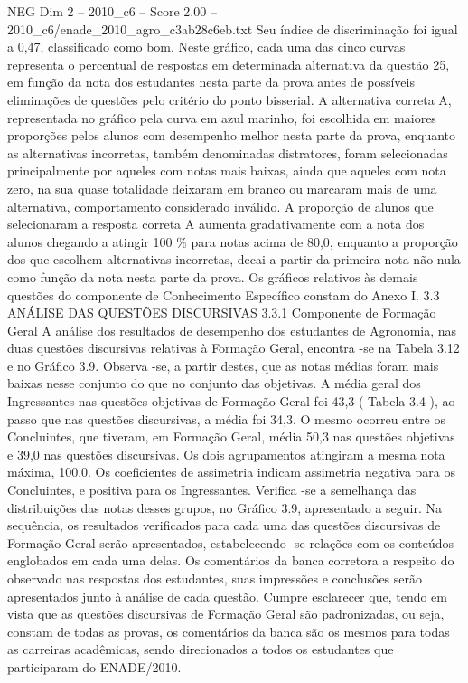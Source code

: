 \begin{textsample}{NEG Dim 2 – 2010\_c6 – Score 2.00 – 2010\_c6/enade\_2010\_agro\_c3ab28c6eb.txt}
Seu índice de discriminação foi igual a 0,47, classificado como bom.
Neste gráfico, cada uma das cinco curvas representa o percentual de respostas em determinada alternativa da questão 25, em função da nota dos estudantes nesta parte da prova antes de possíveis eliminações de questões pelo critério do ponto bisserial.
A alternativa correta A, representada no gráfico pela curva em azul marinho, foi escolhida em maiores proporções pelos alunos com desempenho melhor nesta parte da prova, enquanto as alternativas incorretas, também denominadas distratores, foram selecionadas principalmente por aqueles com notas mais baixas, ainda que aqueles com nota zero, na sua quase totalidade deixaram em branco ou marcaram mais de uma alternativa, comportamento considerado inválido.
A proporção de alunos que selecionaram a resposta correta A aumenta gradativamente com a nota dos alunos chegando a atingir 100 \% para notas acima de 80,0, enquanto a proporção dos que escolhem alternativas incorretas, decai a partir da primeira nota não nula como função da nota nesta parte da prova.
Os gráficos relativos às demais questões do componente de Conhecimento Específico constam do Anexo I. 3.3 ANÁLISE DAS QUESTÕES DISCURSIVAS 3.3.1 Componente de Formação Geral A análise dos resultados de desempenho dos estudantes de Agronomia, nas duas questões discursivas relativas à Formação Geral, encontra -se na Tabela 3.12 e no Gráfico 3.9.
Observa -se, a partir destes, que as notas médias foram mais baixas nesse conjunto do que no conjunto das objetivas.
A média geral dos Ingressantes nas questões objetivas de Formação Geral foi 43,3 ( Tabela 3.4 ), ao passo que nas questões discursivas, a média foi 34,3.
O mesmo ocorreu entre os Concluintes, que tiveram, em Formação Geral, média 50,3 nas questões objetivas e 39,0 nas questões discursivas.
Os dois agrupamentos atingiram a mesma nota máxima, 100,0.
Os coeficientes de assimetria indicam assimetria negativa para os Concluintes, e positiva para os Ingressantes.
Verifica -se a semelhança das distribuições das notas desses grupos, no Gráfico 3.9, apresentado a seguir.
Na sequência, os resultados verificados para cada uma das questões discursivas de Formação Geral serão apresentados, estabelecendo -se relações com os conteúdos englobados em cada uma delas.
Os comentários da banca corretora a respeito do observado nas respostas dos estudantes, suas impressões e conclusões serão apresentados junto à análise de cada questão.
Cumpre esclarecer que, tendo em vista que as questões discursivas de Formação Geral são padronizadas, ou seja, constam de todas as provas, os comentários da banca são os mesmos para todas as carreiras acadêmicas, sendo direcionados a todos os estudantes que participaram do ENADE/2010.

\end{textsample}
